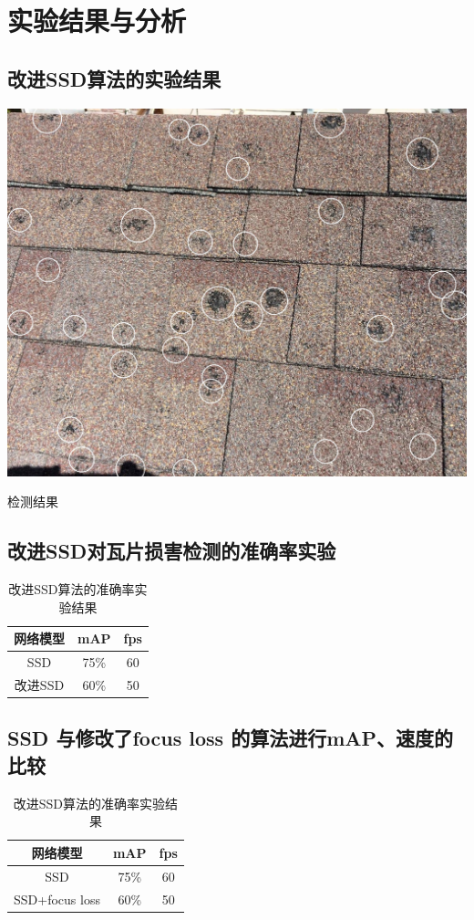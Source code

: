 \section{实验结果与分析}
\setcounter{figure}{0}

\subsection{改进SSD算法的实验结果}
\begin{uscfigure}
	\includegraphics[width=\textwidth]{./Pictures/result.jpg}	
	\caption{检测结果}
	\label{result}
\end{uscfigure}
\subsection{改进SSD对瓦片损害检测的准确率实验}
\begin{table}[htbp]
	\centering
	\caption{改进SSD算法的准确率实验结果}
	\label{}
	\begin{tabular}{ccc}
		\toprule
		网络模型 & mAP & fps\\
		\midrule
		SSD 	& 75\% & 60\\
		改进SSD  &  60\% & 50\\
		\bottomrule
	\end{tabular}
\end{table}
\subsection{SSD 与修改了focus loss 的算法进行mAP、速度的比较}
\begin{table}[htbp]
	\centering
	\caption{改进SSD算法的准确率实验结果}
	\label{}
	\begin{tabular}{ccc}
		\toprule
		网络模型 & mAP & fps\\
		\midrule
		SSD 	& 75\% & 60\\
		SSD+focus loss  &  60\% & 50\\
		\bottomrule
	\end{tabular}
\end{table}

